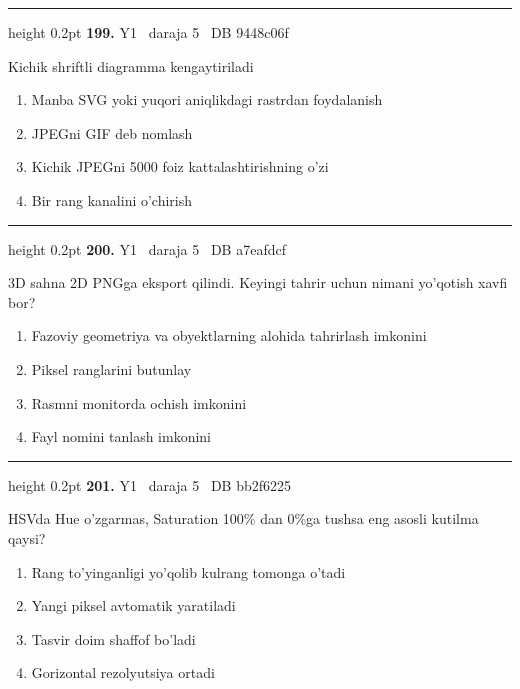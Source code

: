 \documentclass[10pt,a4paper,oneside]{article}
\begin{document}
\vspace{2mm}\hrule height 0.2pt \vspace{4mm}
\hypertarget{q199}{\textbf{\color{ink}199.}}  {\color{muted}\scriptsize Y1 \textbullet\ daraja 5 \textbullet\ DB 9448c06f}
\par
Kichik shriftli diagramma kengaytiriladi
\begin{enumerate}[label=\Alph*),leftmargin=9mm]
\item Manba SVG yoki yuqori aniqlikdagi rastrdan foydalanish
\item JPEGni GIF deb nomlash
\item Kichik JPEGni 5000 foiz kattalashtirishning o'zi
\item Bir rang kanalini o'chirish
\end{enumerate}
\vspace{2mm}\hrule height 0.2pt \vspace{4mm}
\hypertarget{q200}{\textbf{\color{ink}200.}}  {\color{muted}\scriptsize Y1 \textbullet\ daraja 5 \textbullet\ DB a7eafdcf}
\par
3D sahna 2D PNGga eksport qilindi. Keyingi tahrir uchun nimani yo'qotish xavfi bor?
\begin{enumerate}[label=\Alph*),leftmargin=9mm]
\item Fazoviy geometriya va obyektlarning alohida tahrirlash imkonini
\item Piksel ranglarini butunlay
\item Rasmni monitorda ochish imkonini
\item Fayl nomini tanlash imkonini
\end{enumerate}
\vspace{2mm}\hrule height 0.2pt \vspace{4mm}
\hypertarget{q201}{\textbf{\color{ink}201.}}  {\color{muted}\scriptsize Y1 \textbullet\ daraja 5 \textbullet\ DB bb2f6225}
\par
HSVda Hue o'zgarmas, Saturation 100\% dan 0\%ga tushsa eng asosli kutilma qaysi?
\begin{enumerate}[label=\Alph*),leftmargin=9mm]
\item Rang to'yinganligi yo'qolib kulrang tomonga o'tadi
\item Yangi piksel avtomatik yaratiladi
\item Tasvir doim shaffof bo'ladi
\item Gorizontal rezolyutsiya ortadi
\end{enumerate}
\end{document}
